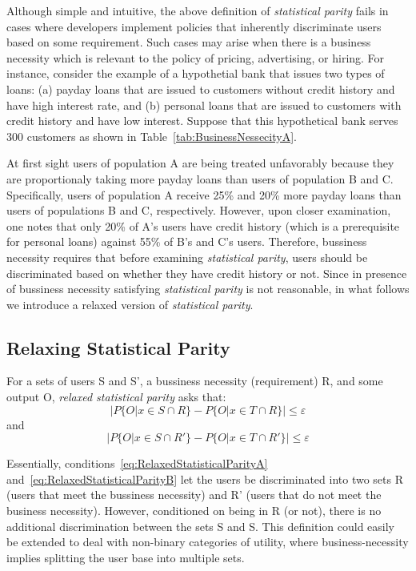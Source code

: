 Although simple and intuitive, the above definition of {\em statistical parity}
fails in cases where developers implement policies that inherently discriminate
users based on some requirement. Such cases may arise when there is a
business necessity which is relevant to the policy of pricing, advertising,
or hiring. For instance, consider the example of a hypothetial bank that issues
two types of loans: (a) payday loans that are issued to customers without credit
history and have high interest rate, and (b) personal loans that are issued to
customers with credit history and have low interest. Suppose that this
hypothetical bank serves 300 customers as shown in
Table~\ref{tab:BusinessNessecityA}.

At first sight users of population A are being treated unfavorably because they
are proportionaly taking more payday loans than users of population B and C.
Specifically, users of population A
receive 25\% and 20\% more payday loans than users of populations B and C,
respectively. However, upon closer examination, one notes that only 20\% of A’s
users have credit history (which is a prerequisite for personal loans) against
55\% of B’s and C’s users. Therefore, bussiness necessity requires that before
examining {\em statistical parity}, users should be discriminated based on whether
they have credit history or not. Since in presence of bussiness necessity 
satisfying {\em statistical parity} is not reasonable, in what follows we introduce
a relaxed version of {\em statistical parity}.

\subsection{Relaxing Statistical Parity}
\label{sect:relaxedstatparity}

For a sets of users S and S', a bussiness necessity (requirement) R, and some
output O, {\em relaxed statistical parity} asks that:
\begin{equation}
|P\{O | x \in S \cap R\} - P\{O | x \in T \cap R\}| \le \varepsilon
\label{eq:RelaxedStatisticalParityA}
\end{equation}
and
\begin{equation}
|P\{O | x \in S \cap R'\} - P\{O | x \in T \cap R'\}| \le \varepsilon
\label{eq:RelaxedStatisticalParityB}
\end{equation}

Essentially, conditions~\ref{eq:RelaxedStatisticalParityA}
and~\ref{eq:RelaxedStatisticalParityB} let the users be discriminated into two
sets R (users that meet the bussiness necessity) and R' (users that do not
meet the business necessity). However, conditioned on being in R (or not),
there is no additional discrimination between the sets S and S. This definition
could easily be extended to deal with non-binary categories of utility, where
business-necessity implies splitting the user base into multiple sets.

